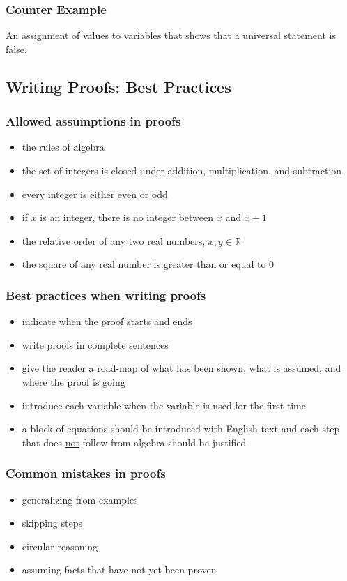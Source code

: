 \subsubsection*{Counter Example}
An assignment of values to variables that shows that a universal statement is false.

\subsection{Writing Proofs: Best Practices}
\subsubsection*{Allowed assumptions in proofs}
\begin{itemize}
  \item the rules of algebra
  \item the set of integers is closed under addition, multiplication, and subtraction
  \item every integer is either even or odd
  \item if $x$ is an integer, there is no integer between $x$ and $x+1$
  \item the relative order of any two real numbers, $x,y \in \mathbb{R}$
  \item the square of any real number is greater than or equal to 0
\end{itemize}
\subsubsection*{Best practices when writing proofs}
\begin{itemize}
  \item indicate when the proof starts and ends
  \item write proofs in complete sentences
  \item give the reader a road-map of what has been shown, what is assumed,
        and where the proof is going
  \item introduce each variable when the variable is used for the first time
  \item a block of equations should be introduced with English text and each
        step that does \underline{not} follow from algebra should be justified
\end{itemize}
\subsubsection*{Common mistakes in proofs}
\begin{itemize}
  \item generalizing from examples
  \item skipping steps
  \item circular reasoning
  \item assuming facts that have not yet been proven
\end{itemize}

